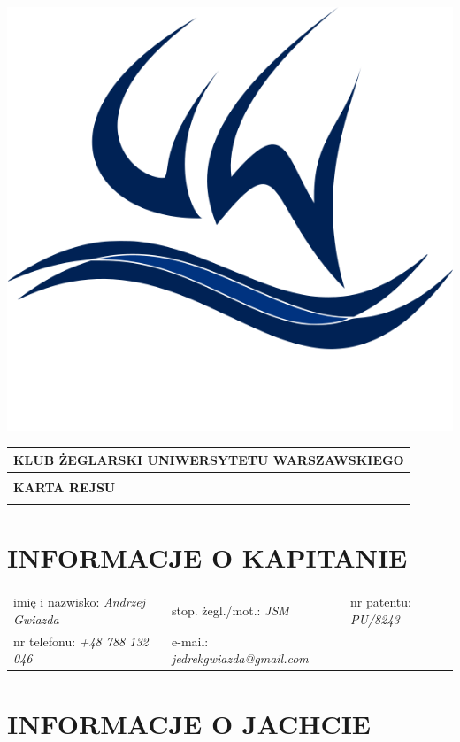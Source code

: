 \documentclass{article}
\author{Andrzej Gwiazda}
\begin{document}
\newpage
\begin{minipage}{0.11\textwidth}
\includegraphics[width=\textwidth]{logo.png}
\end{minipage}
\begin{minipage}{0.89\textwidth}
\begin{tabularx}{\textwidth} { 
  | >{\centering\arraybackslash}X | }
 \hline
 \textbf{KLUB ŻEGLARSKI UNIWERSYTETU WARSZAWSKIEGO} \\
 \hline
 \\
 \textbf{\huge KARTA REJSU} \\
 \\
\hline
\end{tabularx}
\end{minipage}

\section*{INFORMACJE O KAPITANIE}
\begin{tabularx}{\textwidth}{X X X}
imię i nazwisko: \textit{Andrzej Gwiazda} & stop. żegl./mot.: \textit{JSM} & nr patentu: \textit{PU/8243} \\
nr telefonu: \textit{+48 788 132 046} & e-mail: \textit{jedrekgwiazda@gmail.com} \\
\end{tabularx}

\section*{INFORMACJE O JACHCIE}
\end{document}

